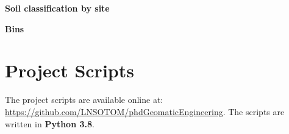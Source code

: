 \documentclass{thesis}
\begin{document}
\newpage
\textbf{Soil classification by site}

\begin{figure}[h!]
	\centering
\end{figure}

\textbf{Bins}

\begin{figure}[h!]
	\centering
\end{figure}


\clearpage
\section{Project Scripts}\label{app:scripts}

The project scripts are available online at:
\newline
\url{https://github.com/LNSOTOM/phdGeomaticEngineering}. 
\newline
The scripts are written in \textbf{Python 3.8}.
\end{document}
